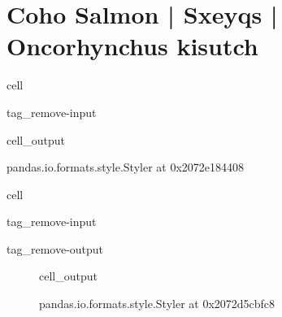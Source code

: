 \documentclass[letterpaper,10pt,english]{jupyterBook}
\begin{document}
\section{Coho Salmon | Sxeyqs | Oncorhynchus kisutch}
\label{\detokenize{Planning:coho-salmon-sxeyqs-oncorhynchus-kisutch}}
\begin{sphinxuseclass}{cell}
\begin{sphinxuseclass}{tag_remove-input}\begin{sphinxVerbatimOutput}

\begin{sphinxuseclass}{cell_output}
\begin{sphinxVerbatim}[commandchars=\\\{\}]
\PYGZlt{}pandas.io.formats.style.Styler at 0x2072e184408\PYGZgt{}
\end{sphinxVerbatim}

\end{sphinxuseclass}\end{sphinxVerbatimOutput}

\end{sphinxuseclass}
\end{sphinxuseclass}
\begin{sphinxuseclass}{cell}
\begin{sphinxuseclass}{tag_remove-input}
\begin{sphinxuseclass}{tag_remove-output}
\end{sphinxuseclass}
\end{sphinxuseclass}
\end{sphinxuseclass}
\begin{figure}[htbp]
\centering
\capstart
\begin{sphinxVerbatimOutput}

\begin{sphinxuseclass}{cell_output}
\begin{sphinxVerbatim}[commandchars=\\\{\}]
\PYGZlt{}pandas.io.formats.style.Styler at 0x2072d5cbfc8\PYGZgt{}
\end{sphinxVerbatim}

\end{sphinxuseclass}\end{sphinxVerbatimOutput}
\caption{}\label{\detokenize{Planning:table5}}\end{figure}
\end{document}
